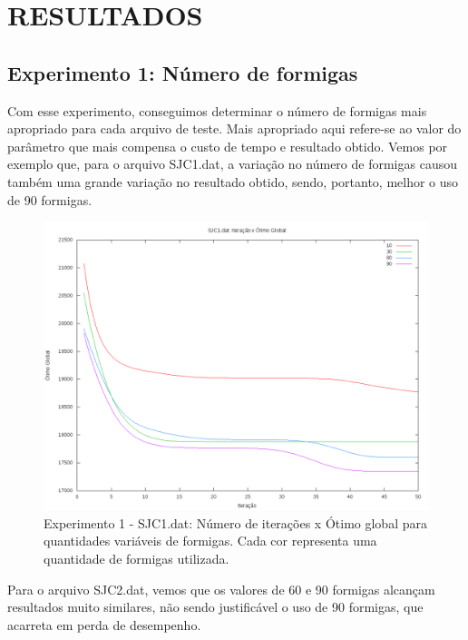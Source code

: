 \documentclass[12pt]{article}
\begin{document}
\section{RESULTADOS} \label{sec:result}

\subsection{Experimento 1: Número de formigas}

Com esse experimento, conseguimos determinar o número de formigas mais apropriado para cada arquivo
de teste. Mais apropriado aqui refere-se ao valor do parâmetro que mais compensa o custo de tempo e 
resultado obtido. Vemos por exemplo que, para o arquivo SJC1.dat, a variação no número de formigas
causou também uma grande variação no resultado obtido, sendo, portanto, melhor o uso de 90 formigas.

\begin{figure}[!htbp]
  \centering
  \includegraphics[width=1\textwidth]{exp1s1.png}
  \caption{Experimento 1 - SJC1.dat: Número de iterações x Ótimo global para quantidades variáveis
  de formigas. Cada cor representa uma quantidade de formigas utilizada.}
  \label{fig:exp1s1}
\end{figure}

Para o arquivo SJC2.dat, vemos que os valores de 60 e 90 formigas alcançam resultados muito similares,
não sendo justificável o uso de 90 formigas, que acarreta em perda de desempenho.
\end{document}
